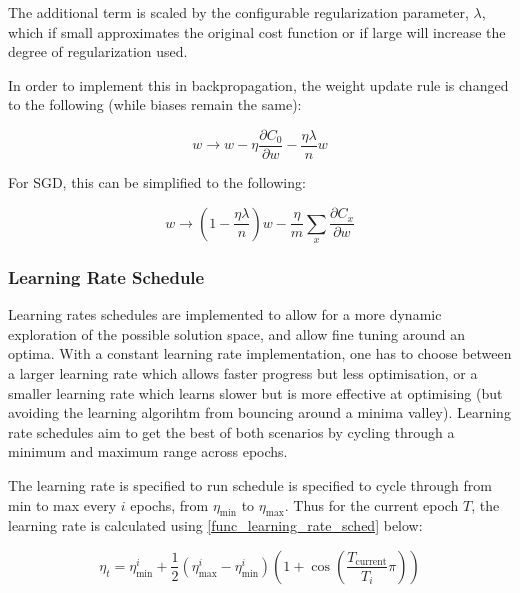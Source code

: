 \documentclass[a4paper,11pt,oneside]{article}
\theoremstyle{plain}
\theoremstyle{definition}
\begin{document}
The additional term is scaled by the configurable regularization parameter, $\lambda$, which if small approximates the original cost function or if large will increase the degree of regularization used. \newline

In order to implement this in backpropagation, the weight update rule is changed to the following (while biases remain the same):

\begin{equation}\label{func_l2_weight_update}
w \rightarrow w-\eta \frac{\partial C_{0}}{\partial w}-\frac{\eta \lambda}{n} w
\end{equation}

For SGD, this can be simplified to the following: 

\begin{equation}\label{func_sgd_l2}
w \rightarrow\left(1-\frac{\eta \lambda}{n}\right) w-\frac{\eta}{m} \sum_{x} \frac{\partial C_{x}}{\partial w}
\end{equation}


\subsubsection{Learning Rate Schedule}\label{imp_learning_rate_schedule}

Learning rates schedules are implemented to allow for a more dynamic exploration of the possible solution space, and allow fine tuning around an optima. With a constant learning rate implementation, one has to choose between a larger learning rate which allows faster progress but less optimisation, or a smaller learning rate which learns slower but is more effective at optimising (but avoiding the learning algorihtm from bouncing around a minima valley). Learning rate schedules aim to get the best of both scenarios by cycling through a minimum and maximum range across epochs.\newline

The learning rate is specified to run schedule is specified to cycle through from min to max every $i$ epochs, from $\eta_{\min}$ to $\eta_{\max}$. Thus for the current epoch $T$, the learning rate is calculated using \ref{func_learning_rate_sched} below:

\begin{equation}\label{func_learning_rate_sched}
\eta_{t}=\eta_{\min }^{i}+\frac{1}{2}\left(\eta_{\max }^{i}-\eta_{\min }^{i}\right)\left(1+\cos \left(\frac{T_{\text {current}}}{T_{i}} \pi\right)\right)
\end{equation}
\end{document}
